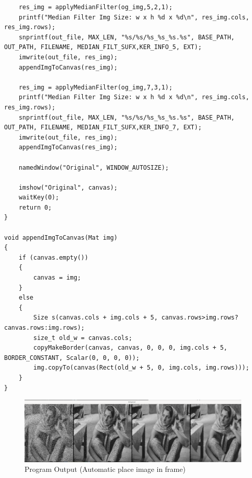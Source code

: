 \documentclass[12pt,a4paper]{report}
\begin{document}
\begin{lstlisting}
    res_img = applyMedianFilter(og_img,5,2,1);
    printf("Median Filter Img Size: w x h %d x %d\n", res_img.cols, res_img.rows);
    snprintf(out_file, MAX_LEN, "%s/%s/%s_%s_%s.%s", BASE_PATH, OUT_PATH, FILENAME, MEDIAN_FILT_SUFX,KER_INFO_5, EXT);
    imwrite(out_file, res_img);
    appendImgToCanvas(res_img);

    res_img = applyMedianFilter(og_img,7,3,1);
    printf("Median Filter Img Size: w x h %d x %d\n", res_img.cols, res_img.rows);
    snprintf(out_file, MAX_LEN, "%s/%s/%s_%s_%s.%s", BASE_PATH, OUT_PATH, FILENAME, MEDIAN_FILT_SUFX,KER_INFO_7, EXT);
    imwrite(out_file, res_img);
    appendImgToCanvas(res_img);

    namedWindow("Original", WINDOW_AUTOSIZE);
    
    imshow("Original", canvas);
    waitKey(0);
    return 0;
}

void appendImgToCanvas(Mat img)
{
    if (canvas.empty())
    {
        canvas = img;
    }
    else
    {
        Size s(canvas.cols + img.cols + 5, canvas.rows>img.rows?canvas.rows:img.rows);
        size_t old_w = canvas.cols;
        copyMakeBorder(canvas, canvas, 0, 0, 0, img.cols + 5, BORDER_CONSTANT, Scalar(0, 0, 0, 0));
        img.copyTo(canvas(Rect(old_w + 5, 0, img.cols, img.rows)));
    }
}

\end{lstlisting}
\begin{figure}[!htb]
  \centering
  \includegraphics[width=1\linewidth]{program.png}
  \caption{Program Output (Automatic place image in frame)}
\end{figure}
\clearpage
\end{document}
